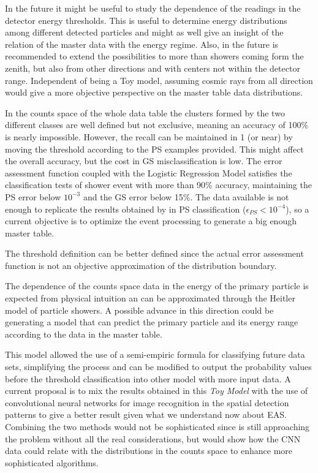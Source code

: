 \documentclass{article}
\begin{document}
In the future it might be useful to study the dependence of the readings in the detector energy thresholds. This is useful to determine energy distributions among different detected particles and might as well give an insight of the relation of the master data with the energy regime. Also, in the future is recommended to extend the possibilities to more than showers coming form the zenith, but also from other directions and with centers not within the detector range. Independent of being a Toy model, assuming cosmic rays from all direction would give a more objective perspective on the master table data distributions.


In the counts space of the whole data table the clusters formed by the two different classes are well defined but not exclusive, meaning an accuracy of 100\% is nearly impossible. However, the recall can be maintained in 1 (or near) by moving the threshold according to the PS examples provided. This might affect the overall accuracy, but the cost in GS misclassification is low. The error assessment function coupled with the Logistic Regression Model satisfies the classification tests of shower event with more than 90\% accuracy, maintaining the PS error below $10^{-3}$ and the GS error below 15\%. The data available is not enough to replicate the results obtained by \cite{UHEgammapaper} in PS classification ($\epsilon_{PS} < 10^{-4} $), so a current objective is to optimize the event processing to generate a big enough master table.

The threshold definition can be better defined since the actual error assessment function is not an objective approximation of the distribution boundary. 

The dependence of the counts space data in the energy of the primary particle is expected from physical intuition an can be approximated through the Heitler model of particle showers\cite{heitlerarticle}. A possible advance in this direction could be generating a model that can predict the primary particle and its energy range according to the data in the master table.

This model allowed the use of a semi-empiric formula for classifying future data sets, simplifying the process and can be modified to output the probability values before the threshold classification into other model with more input data. A current proposal is to mix the results obtained in this \textit{Toy Model} with the use of convolutional neural networks for image recognition in the spatial detection patterns to give a better result given what we understand now about EAS\cite{charsEAS}. Combining the two methods would not be sophisticated since is still approaching the problem without all the real considerations, but would show how the CNN data could relate with the distributions in the counts space to enhance more sophisticated algorithms. 
\end{document}
